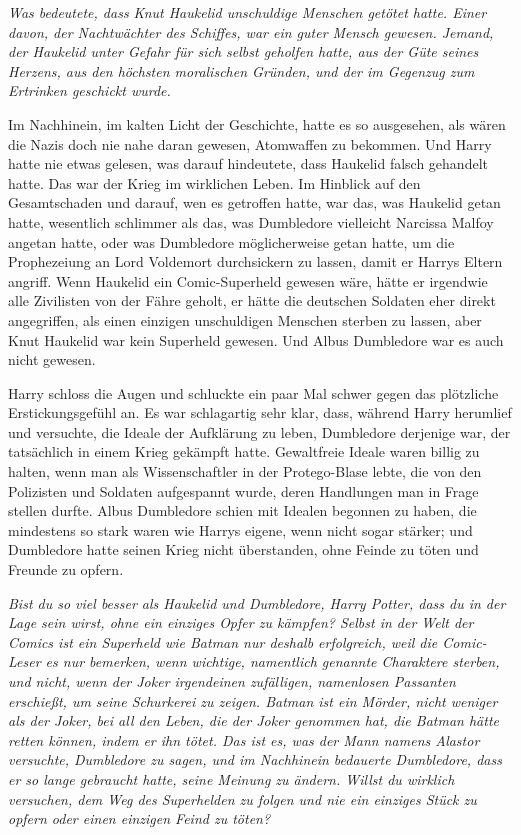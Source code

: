 \emph{Was bedeutete, dass Knut Haukelid unschuldige Menschen getötet hatte.
Einer davon, der Nachtwächter des Schiffes, war ein guter Mensch gewesen.
Jemand, der Haukelid unter Gefahr für sich selbst geholfen hatte, aus der Güte
seines Herzens, aus den höchsten moralischen Gründen, und der im Gegenzug zum
Ertrinken geschickt wurde.}

Im Nachhinein, im kalten Licht der Geschichte, hatte es so ausgesehen, als wären
die Nazis doch nie nahe daran gewesen, Atomwaffen zu bekommen. Und Harry hatte
nie etwas gelesen, was darauf hindeutete, dass Haukelid falsch gehandelt hatte.
Das war der Krieg im wirklichen Leben. Im Hinblick auf den Gesamtschaden und
darauf, wen es getroffen hatte, war das, was Haukelid getan hatte, wesentlich
schlimmer als das, was Dumbledore vielleicht Narcissa Malfoy angetan hatte, oder
was Dumbledore möglicherweise getan hatte, um die Prophezeiung an Lord Voldemort
durchsickern zu lassen, damit er Harrys Eltern angriff. Wenn Haukelid ein
Comic-Superheld gewesen wäre, hätte er irgendwie alle Zivilisten von der Fähre
geholt, er hätte die deutschen Soldaten eher direkt angegriffen, als einen
einzigen unschuldigen Menschen sterben zu lassen, aber Knut Haukelid war kein
Superheld gewesen. Und Albus Dumbledore war es auch nicht gewesen.

Harry schloss die Augen und schluckte ein paar Mal schwer gegen das plötzliche
Erstickungsgefühl an. Es war schlagartig sehr klar, dass, während Harry
herumlief und versuchte, die Ideale der Aufklärung zu leben, Dumbledore
derjenige war, der tatsächlich in einem Krieg gekämpft hatte. Gewaltfreie Ideale
waren billig zu halten, wenn man als Wissenschaftler in der Protego-Blase lebte,
die von den Polizisten und Soldaten aufgespannt wurde, deren Handlungen man in
Frage stellen durfte. Albus Dumbledore schien mit Idealen begonnen zu haben, die
mindestens so stark waren wie Harrys eigene, wenn nicht sogar stärker; und
Dumbledore hatte seinen Krieg nicht überstanden, ohne Feinde zu töten und
Freunde zu opfern.

\emph{Bist du so viel besser als Haukelid und Dumbledore, Harry Potter, dass du
in der Lage sein wirst, ohne ein einziges Opfer zu kämpfen? Selbst in der Welt
der Comics ist ein Superheld wie Batman nur deshalb erfolgreich, weil die
Comic-Leser es nur bemerken, wenn wichtige, namentlich genannte Charaktere
sterben, und nicht, wenn der Joker irgendeinen zufälligen, namenlosen Passanten
erschießt, um seine Schurkerei zu zeigen. Batman ist ein Mörder, nicht weniger
als der Joker, bei all den Leben, die der Joker genommen hat, die Batman hätte
retten können, indem er ihn tötet. Das ist es, was der Mann namens Alastor
versuchte, Dumbledore zu sagen, und im Nachhinein bedauerte Dumbledore, dass er
so lange gebraucht hatte, seine Meinung zu ändern. Willst du wirklich versuchen,
dem Weg des Superhelden zu folgen und nie ein einziges Stück zu opfern oder
einen einzigen Feind zu töten?}

